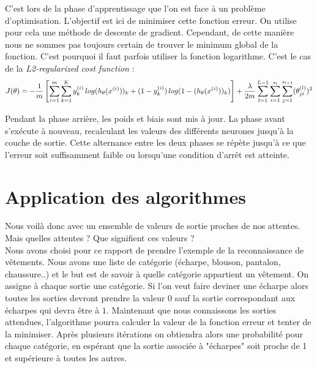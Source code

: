 	C'est lors de la phase d'apprentissage que l'on est face à un problème d'optimisation. L'objectif est ici de minimiser cette fonction erreur. On utilise pour cela une méthode de descente de gradient. Cependant, de cette manière nous ne sommes pas toujours certain de trouver le minimum global de la fonction. C'est pourquoi il faut parfois utiliser la fonction logarithme. C'est le cas de la \textit{L2-regularized cost function} :
	$$J(\theta) = -{1 \over m} \left[ \sum_{i=1}^m \sum_{k=1}^K y_k^{(i)}\,log(h_\theta(x^{(i)}))_k + (1-y_k^{(i)})\,log(1 - (h_\theta(x^{(i)}))_k) \right] + {\lambda \over 2m } \sum_{l=1}^{L-1} \sum_{i=1}^{s_l} \sum_{j=1}^{s_{l+1}} (\theta_{ji}^{(l)})^2$$

	Pendant la phase arrière, les poids et biais sont mis à jour. La phase avant s'exécute à nouveau, recalculant les valeurs des différents neurones jusqu'à la couche de sortie. Cette alternance entre les deux phases se répète jusqu'à ce que l'erreur soit suffisamment faible ou lorsqu'une condition d'arrêt est atteinte.	
	
\section{Application des algorithmes}
	Nous voilà donc avec un ensemble de valeurs de sortie proches de nos attentes. Mais quelles attentes ? Que signifient ces valeurs ? \\
	
	Nous avons choisi pour ce rapport de prendre l'exemple de la reconnaissance de vêtements. Nous avons une liste de catégorie (écharpe, blouson, pantalon, chaussure..) et le but est de savoir à quelle catégorie appartient un vêtement. On assigne à chaque sortie une catégorie. Si l'on veut faire deviner une écharpe alors toutes les sorties devront prendre la valeur $0$ sauf la sortie correspondant aux écharpes qui devra être à $1$. Maintenant que nous connaissons les sorties attendues, l'algorithme pourra calculer la valeur de la fonction erreur et tenter de la minimiser. Après plusieurs itérations on obtiendra alors une probabilité pour chaque catégorie, en espérant que la sortie associée à "écharpes" soit proche de 1 et supérieure à toutes les autres.\\
	
